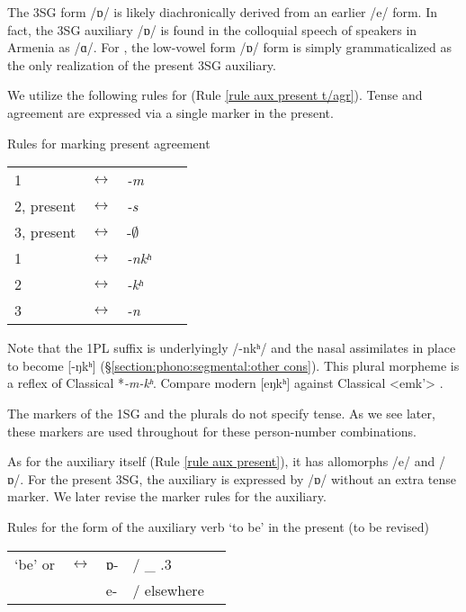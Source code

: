 The {\iaIA} 3SG form /{ɒ}/ is likely diachronically derived from an earlier /{e}/ form. In fact, the 3SG auxiliary /{ɒ}/ is found in the colloquial speech of {\seaSE} speakers in Armenia as /ɑ/. For {\iaIA}, the low-vowel form /{ɒ}/ form is simply grammaticalized as the only realization of the present 3SG auxiliary.



We utilize the following rules for {\iaIA} (Rule \ref{rule aux present t/agr}). Tense and agreement are expressed via a single marker in the present. 

\begin{newruleblock}{Rules for marking present agreement} %
	\begin{center}
		\begin{tabular}{lll ll}
			1{\sg} &$\leftrightarrow$ &\textit{{-m}}\\
			2{\sg}, present &$\leftrightarrow$ &\textit{{-s}}\\
			3{\sg}, present &$\leftrightarrow$ &-$\emptyset$\\
			1{\pl} &$\leftrightarrow$ &\textit{{-nkʰ}}\\
			2{\pl} &$\leftrightarrow$ &\textit{{-kʰ}}\\
			3{\pl} &$\leftrightarrow$ &\textit{{-n}}
		\end{tabular}
	\end{center}
\end{newruleblock} 

Note that the 1PL suffix is underlyingly /-nkʰ/ and the nasal assimilates in place to become [-ŋkʰ] (\S\ref{section:phono:segmental:other cons}). This plural morpheme is a reflex of Classical *\textit{-m-kʰ}. Compare modern [eŋkʰ] against Classical  <emk'> \citep[26]{Thomson-1989-IntroClassicalArmenian}. 

The markers of the 1SG and the plurals do not specify tense. As we see later, these markers are used throughout {\iaIA} for these person-number combinations. 

As for the auxiliary itself (Rule \ref{rule aux present}), it has allomorphs /{e}/ and /{ɒ}/. For the present 3SG, the auxiliary is expressed by /{ɒ}/ without an extra tense marker. We later revise the marker rules for the auxiliary.

\begin{newruleblock}{Rules for the form of the auxiliary verb `to be' in the present (to be revised)} %
	\begin{center}
		\begin{tabular}{lll ll}
			`be' or {\auxgloss} &$\leftrightarrow$ &{{ɒ-}} & / \_ {\prs}.3{\sg}\\
			& &{{e-}} & / elsewhere\\
		\end{tabular}
	\end{center}
\end{newruleblock} 



